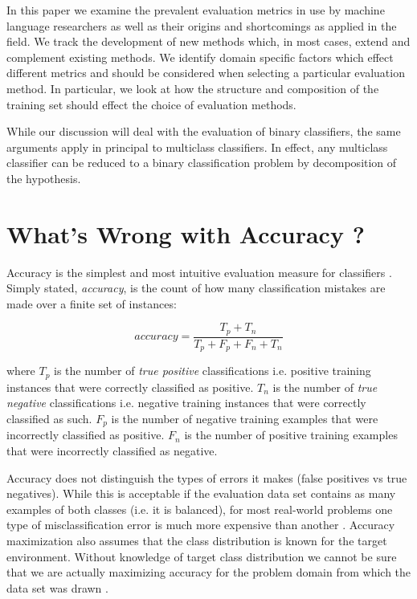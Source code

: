 \documentclass[10pt]{unbthesis}
\begin{document}
In this paper we examine the prevalent evaluation metrics in use by
machine language researchers as well as their origins and shortcomings as
applied in the field. We track the development of new methods which,
in most cases, extend and complement existing methods. We identify domain
specific factors which effect different metrics and should be
considered when selecting a particular evaluation method. In
particular, we look at how the structure and composition of the
training set should effect the choice of evaluation methods.

While our discussion will deal with the evaluation of binary
classifiers, the same arguments apply in principal to multiclass
classifiers. In effect, any multiclass classifier can be reduced to a
binary classification problem by decomposition of the hypothesis. 


\section{What's Wrong with Accuracy ?}
Accuracy is the simplest and most intuitive evaluation measure for
classifiers \cite{RefWorks:43}. Simply stated, \textit{accuracy}, is the
count of how many classification mistakes are made over a finite
set of instances:

\begin{equation}
\label{equ:accuracy}
accuracy = \frac{T_p + T_n}{T_p + F_p + F_n + T_n}
\end{equation}

where \(T_p\) is the number of \textit{true positive} classifications
i.e. positive training instances that were correctly classified as
positive. \(T_n\) is the number of \textit{true negative}
classifications i.e. negative training instances that were correctly
classified as such. \(F_p\) is the number of negative training
examples that were incorrectly classified as positive. \(F_n\) is the
number of positive training examples that were incorrectly classified
as negative.

Accuracy does not distinguish the types of errors it makes (false
positives vs true negatives). While this is acceptable if the evaluation
data set contains as many examples of both classes (i.e. it is
balanced), for most real-world problems one type of misclassification
error is much more expensive than another \cite{RefWorks:45}. Accuracy
maximization also assumes that the class distribution is known for the
target environment. Without knowledge of target class distribution we
cannot be sure that we are actually maximizing accuracy for the
problem domain from which the data set was drawn \cite{RefWorks:45}.
\end{document}
